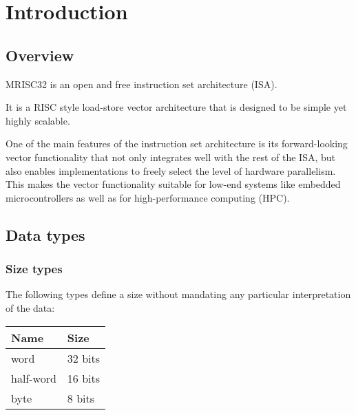 %

\chapter{Introduction}

\section{Overview}

MRISC32 is an open and free instruction set architecture (ISA).

It is a RISC style load-store vector architecture that is designed to be simple
yet highly scalable.

One of the main features of the instruction set architecture is its
forward-looking vector functionality that not only integrates well with the
rest of the ISA, but also enables implementations to freely select the level of
hardware parallelism. This makes the vector functionality suitable for low-end
systems like embedded microcontrollers as well as for high-performance
computing (HPC).


\section{Data types}

\subsection{Size types}

The following types define a size without mandating any particular
interpretation of the data:

\begin{tabular}{|l|l|}
  \hline
  \textbf{Name} & \textbf{Size} \\
  \hline
  word & 32 bits \\
  \hline
  half-word & 16 bits \\
  \hline
  byte & 8 bits \\
  \hline
\end{tabular}


